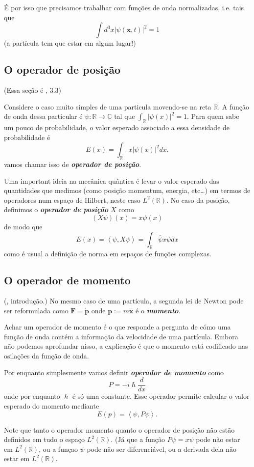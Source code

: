 É por isso que precisamos trabalhar com funções  de onda normalizadas, i.e. tais que
\[\int d^3x |\psi(\mathbf{x},t)|^2=1\]
(a partícula tem que estar em algum lugar!)

\subsection{O operador de posição}

(Essa seção é \cite{hallq}, 3.3)

Considere o caso muito simples de uma particula movendo-se na reta $\mathbb{R}$. A função de onda dessa particular é $\psi:\mathbb{R}\to \mathbb{C}$ tal que $\int_{\mathbb{R}}|\psi(x)|^2=1$. Para quem sabe um pouco de probabilidade, o valor esperado associado a essa densidade de probabilidade é
\[E(x)=\int_{\mathbb{R}}x |\psi(x)|^2dx.\]
vamos chamar isso de \textit{\textbf{operador de posição}}.

Uma important ideia na mecânica quântica é levar o valor esperado das quantidades que medimos (como posição momentum, energia, etc…) em termos de operadores num espaço de Hilbert, neste caso $L^2(\mathbb{R})$. No caso da posição, definimos o \textit{\textbf{operador de posição}} $X$ como
 \[(X\psi)(x)=x\psi(x)\]
 de modo que 
 \[E(x)=\left<\psi,X\psi\right> =\int_{\mathbb{R}}\overline{\psi}x\psi dx\]
 como é usual a definição de norma em espaços de funções complexas.

\subsection{O operador de momento}

(\cite{clas}, introdução.) No mesmo caso de uma partícula, a segunda lei de Newton pode ser reformulada como  $\mathbf{F}=\dot{\mathbf{p}}$ onde $\mathbf{p}:=m\dot{\mathbf{x}}$ é o \textit{\textbf{momento}}.

Achar um operador de momento é o que responde a pergunta de cómo uma função de onda contém a informação da velocidade de uma partícula. Embora não podemos aprofundar nisso, a explicação é que o momento está codificado nas osilações da função de onda.

Por enquanto simplesmente vamos definir \textit{\textbf{operador de momento}} como
\[P=-i\hslash\frac{d}{dx}\]
 onde por enquanto $\hslash$ é só uma constante. Esse operador permite calcular o valor esperado do momento mediante
 \[E(p)=\left<\psi,P\psi\right>.\]

\begin{remark}\leavevmode
	Note que tanto o operador momento quanto o operador de posição não estão definidos em tudo o espaço $L^2(\mathbb{R})$. (Já que a função $P\psi=x\psi$ pode não estar em $L^2(\mathbb{R})$, ou a funçao $\psi$ pode não ser diferenciável, ou a derivada dela não estar em $L^2(\mathbb{R})$.
\end{remark}


